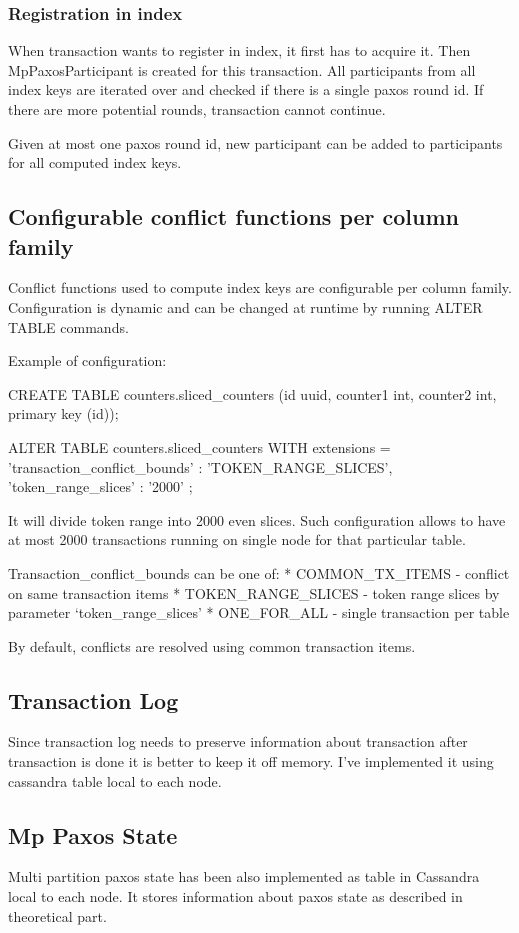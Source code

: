 \subsubsection{Registration in index}
When transaction wants to register in index, it first has to acquire it. Then MpPaxosParticipant is created for this transaction. All participants from all index keys are iterated over and checked if there is a single paxos round id. If there are more potential rounds, transaction cannot continue. 


Given at most one paxos round id, new participant can be added to participants for all computed index keys.


\subsection{Configurable conflict functions per column family}
Conflict functions used to compute index keys are configurable per column family. Configuration is dynamic and can be changed at runtime by running ALTER TABLE commands.


Example of configuration:


CREATE TABLE counters.sliced_counters (id uuid, counter1 int, counter2 int, primary key (id));


ALTER TABLE counters.sliced_counters WITH extensions = { 'transaction_conflict_bounds' : 'TOKEN_RANGE_SLICES', 'token_range_slices' : '2000' };


It will divide token range into 2000 even slices. Such configuration allows to have at most 2000 transactions running on single node for that particular table.


Transaction_conflict_bounds can be one of:
* COMMON_TX_ITEMS - conflict on same transaction items
* TOKEN_RANGE_SLICES - token range slices by parameter ‘token_range_slices’
* ONE_FOR_ALL - single transaction per table


By default, conflicts are resolved using common transaction items.


\subsection{Transaction Log}
Since transaction log needs to preserve information about transaction after transaction is done it is better to keep it off memory. I’ve implemented it using cassandra table local to each node. 


\subsection{Mp Paxos State}
Multi partition paxos state has been also implemented as table in Cassandra local to each node. It stores information about paxos state as described in theoretical part.


